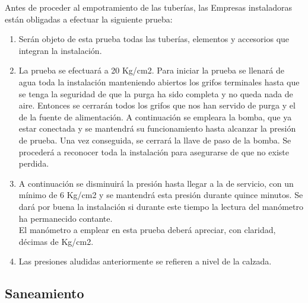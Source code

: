\documentclass[../main.tex]{subfiles}
\begin{document}
\begin{itemize}
    \vspace{0.5 cm}
    Antes de proceder al empotramiento de las tuberías, las Empresas instaladoras están obligadas a efectuar la siguiente prueba:
    \begin{enumerate}
        \item Serán objeto de esta prueba todas las tuberías, elementos y accesorios que integran la instalación. 
        \item La prueba se efectuará a 20 Kg/cm2. Para iniciar la prueba se llenará de agua toda la instalación manteniendo abiertos los grifos terminales hasta que se tenga la seguridad de que la purga ha sido completa y no queda nada de aire. Entonces se cerrarán todos los grifos que nos han servido de purga y el de la fuente de alimentación. A continuación se empleara la bomba, que ya estar conectada y se mantendrá su funcionamiento hasta alcanzar la presión de prueba. Una vez conseguida, se cerrará la llave de paso de la bomba. Se procederá a reconocer toda la instalación para asegurarse de que no existe perdida.
        \item A continuación se disminuirá la presión hasta llegar a la de servicio, con un mínimo de 6 Kg/cm2 y se mantendrá esta presión durante quince minutos. Se dará por buena la instalación si durante este tiempo la lectura del manómetro ha permanecido contante. \\
        El manómetro a emplear en esta prueba deberá apreciar, con claridad, décimas de Kg/cm2. 
        \item Las presiones aludidas anteriormente se refieren a nivel de la calzada.
    \end{enumerate}
\end{itemize}

\subsection{Saneamiento}
\end{document}
